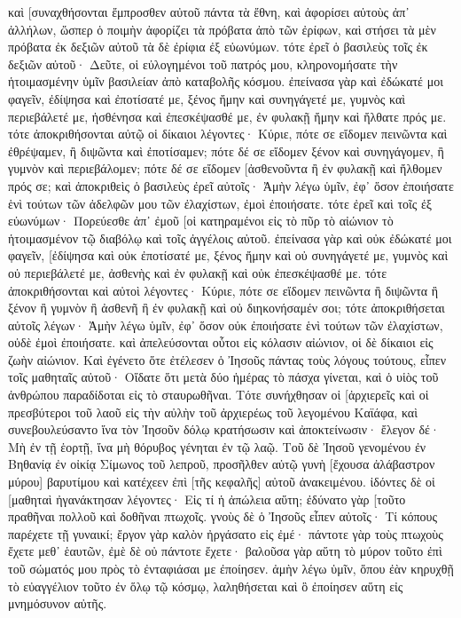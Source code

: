 καὶ [συναχθήσονται ἔμπροσθεν αὐτοῦ πάντα τὰ ἔθνη, καὶ ἀφορίσει αὐτοὺς ἀπ᾽ ἀλλήλων, ὥσπερ ὁ ποιμὴν ἀφορίζει τὰ πρόβατα ἀπὸ τῶν ἐρίφων, 
καὶ στήσει τὰ μὲν πρόβατα ἐκ δεξιῶν αὐτοῦ τὰ δὲ ἐρίφια ἐξ εὐωνύμων. 
τότε ἐρεῖ ὁ βασιλεὺς τοῖς ἐκ δεξιῶν αὐτοῦ· Δεῦτε, οἱ εὐλογημένοι τοῦ πατρός μου, κληρονομήσατε τὴν ἡτοιμασμένην ὑμῖν βασιλείαν ἀπὸ καταβολῆς κόσμου. 
ἐπείνασα γὰρ καὶ ἐδώκατέ μοι φαγεῖν, ἐδίψησα καὶ ἐποτίσατέ με, ξένος ἤμην καὶ συνηγάγετέ με, 
γυμνὸς καὶ περιεβάλετέ με, ἠσθένησα καὶ ἐπεσκέψασθέ με, ἐν φυλακῇ ἤμην καὶ ἤλθατε πρός με. 
τότε ἀποκριθήσονται αὐτῷ οἱ δίκαιοι λέγοντες· Κύριε, πότε σε εἴδομεν πεινῶντα καὶ ἐθρέψαμεν, ἢ διψῶντα καὶ ἐποτίσαμεν; 
πότε δέ σε εἴδομεν ξένον καὶ συνηγάγομεν, ἢ γυμνὸν καὶ περιεβάλομεν; 
πότε δέ σε εἴδομεν [ἀσθενοῦντα ἢ ἐν φυλακῇ καὶ ἤλθομεν πρός σε; 
καὶ ἀποκριθεὶς ὁ βασιλεὺς ἐρεῖ αὐτοῖς· Ἀμὴν λέγω ὑμῖν, ἐφ᾽ ὅσον ἐποιήσατε ἑνὶ τούτων τῶν ἀδελφῶν μου τῶν ἐλαχίστων, ἐμοὶ ἐποιήσατε. 
τότε ἐρεῖ καὶ τοῖς ἐξ εὐωνύμων· Πορεύεσθε ἀπ᾽ ἐμοῦ [οἱ κατηραμένοι εἰς τὸ πῦρ τὸ αἰώνιον τὸ ἡτοιμασμένον τῷ διαβόλῳ καὶ τοῖς ἀγγέλοις αὐτοῦ. 
ἐπείνασα γὰρ καὶ οὐκ ἐδώκατέ μοι φαγεῖν, [ἐδίψησα καὶ οὐκ ἐποτίσατέ με, 
ξένος ἤμην καὶ οὐ συνηγάγετέ με, γυμνὸς καὶ οὐ περιεβάλετέ με, ἀσθενὴς καὶ ἐν φυλακῇ καὶ οὐκ ἐπεσκέψασθέ με. 
τότε ἀποκριθήσονται καὶ αὐτοὶ λέγοντες· Κύριε, πότε σε εἴδομεν πεινῶντα ἢ διψῶντα ἢ ξένον ἢ γυμνὸν ἢ ἀσθενῆ ἢ ἐν φυλακῇ καὶ οὐ διηκονήσαμέν σοι; 
τότε ἀποκριθήσεται αὐτοῖς λέγων· Ἀμὴν λέγω ὑμῖν, ἐφ᾽ ὅσον οὐκ ἐποιήσατε ἑνὶ τούτων τῶν ἐλαχίστων, οὐδὲ ἐμοὶ ἐποιήσατε. 
καὶ ἀπελεύσονται οὗτοι εἰς κόλασιν αἰώνιον, οἱ δὲ δίκαιοι εἰς ζωὴν αἰώνιον. 
Καὶ ἐγένετο ὅτε ἐτέλεσεν ὁ Ἰησοῦς πάντας τοὺς λόγους τούτους, εἶπεν τοῖς μαθηταῖς αὐτοῦ· 
Οἴδατε ὅτι μετὰ δύο ἡμέρας τὸ πάσχα γίνεται, καὶ ὁ υἱὸς τοῦ ἀνθρώπου παραδίδοται εἰς τὸ σταυρωθῆναι. 
Τότε συνήχθησαν οἱ [ἀρχιερεῖς καὶ οἱ πρεσβύτεροι τοῦ λαοῦ εἰς τὴν αὐλὴν τοῦ ἀρχιερέως τοῦ λεγομένου Καϊάφα, 
καὶ συνεβουλεύσαντο ἵνα τὸν Ἰησοῦν δόλῳ κρατήσωσιν καὶ ἀποκτείνωσιν· 
ἔλεγον δέ· Μὴ ἐν τῇ ἑορτῇ, ἵνα μὴ θόρυβος γένηται ἐν τῷ λαῷ. 
Τοῦ δὲ Ἰησοῦ γενομένου ἐν Βηθανίᾳ ἐν οἰκίᾳ Σίμωνος τοῦ λεπροῦ, 
προσῆλθεν αὐτῷ γυνὴ [ἔχουσα ἀλάβαστρον μύρου] βαρυτίμου καὶ κατέχεεν ἐπὶ [τῆς κεφαλῆς] αὐτοῦ ἀνακειμένου. 
ἰδόντες δὲ οἱ [μαθηταὶ ἠγανάκτησαν λέγοντες· Εἰς τί ἡ ἀπώλεια αὕτη; 
ἐδύνατο γὰρ [τοῦτο πραθῆναι πολλοῦ καὶ δοθῆναι πτωχοῖς. 
γνοὺς δὲ ὁ Ἰησοῦς εἶπεν αὐτοῖς· Τί κόπους παρέχετε τῇ γυναικί; ἔργον γὰρ καλὸν ἠργάσατο εἰς ἐμέ· 
πάντοτε γὰρ τοὺς πτωχοὺς ἔχετε μεθ᾽ ἑαυτῶν, ἐμὲ δὲ οὐ πάντοτε ἔχετε· 
βαλοῦσα γὰρ αὕτη τὸ μύρον τοῦτο ἐπὶ τοῦ σώματός μου πρὸς τὸ ἐνταφιάσαι με ἐποίησεν. 
ἀμὴν λέγω ὑμῖν, ὅπου ἐὰν κηρυχθῇ τὸ εὐαγγέλιον τοῦτο ἐν ὅλῳ τῷ κόσμῳ, λαληθήσεται καὶ ὃ ἐποίησεν αὕτη εἰς μνημόσυνον αὐτῆς. 
